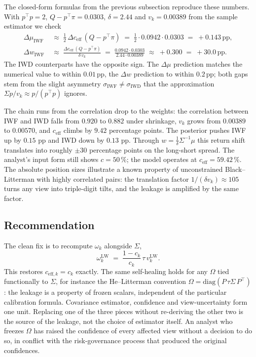 \documentclass[a4paper,11pt]{article}
\theoremstyle{plain}
\theoremstyle{definition}
\newcommand{\LW}{\mathrm{LW}}
\newcommand{\eff}{\mathrm{eff}}
\begin{document}
The closed-form formulas from the previous subsection reproduce these
numbers. With $p^\top p = 2$, $Q - p^\top\pi = 0.0303$, $\delta = 2.44$
and $v_k = 0.00389$ from the sample estimator we check
\begin{align*}
    \Delta\mu_{\mathrm{IWF}} \;&\approx\; \tfrac{1}{2}\,\Delta c_{\eff}\,(Q-p^\top\pi)
    \;=\; \tfrac{1}{2}\cdot 0.0942 \cdot 0.0303
    \;=\; +0.143\,\text{pp},\\
    \Delta w_{\mathrm{IWF}} \;&\approx\; \frac{\Delta c_{\eff}\,(Q-p^\top\pi)}{\delta\,v_k}
    \;=\; \frac{0.0942 \cdot 0.0303}{2.44 \cdot 0.00389}
    \;\approx\; +0.300
    \;=\; +30.0\,\text{pp}.
\end{align*}
The IWD counterparts have the opposite sign. The $\Delta\mu$ prediction
matches the numerical value to within $0.01$\,pp, the $\Delta w$
prediction to within $0.2$\,pp; both gaps stem from the slight
asymmetry $\sigma_{\mathrm{IWF}} \neq \sigma_{\mathrm{IWD}}$ that the
approximation $\Sigma p / v_k \approx p / (p^\top p)$ ignores.

The chain runs from the correlation drop to the weights: the
correlation between IWF and IWD
falls from $0.920$ to $0.882$ under shrinkage, $v_k$ grows from
$0.00389$ to $0.00570$, and $c_{\eff}$ climbs by $9.42$ percentage
points. The posterior pushes IWF up by $0.15$ pp and IWD down by $0.13$
pp. Through $w = \tfrac{1}{\delta}\Sigma^{-1}\mu$ this return shift
translates into roughly $\pm 30$ percentage points on the long-short
spread. The analyst's input form still shows $c = 50\,\%$; the model
operates at $c_{\eff} = 59.42\,\%$. The absolute position sizes
illustrate a known property of unconstrained Black--Litterman with
highly correlated pairs: the translation factor
$1/(\delta v_k) \approx 105$ turns any view into triple-digit tilts,
and the leakage is amplified by the same factor.

\subsection{Recommendation}
\label{sec:rec}

The clean fix is to recompute $\omega_k$ alongside $\Sigma$,
\[
  \omega_k^{\LW} \;=\; \frac{1-c_k}{c_k}\,\tau\,v_k^{\LW}.
\]
This restores $c_{\eff,k} = c_k$ exactly. The same self-healing holds
for any $\Omega$ tied functionally to $\Sigma$, for instance the
He--Litterman convention $\Omega = \mathrm{diag}(P\,\tau\Sigma\,P^\top)$:
the leakage is a property of frozen scalars, independent of the
particular calibration formula. Covariance estimator, confidence and
view-uncertainty form one unit. Replacing one of the three pieces
without re-deriving the other two is the source of the leakage, not the
choice of estimator itself. An analyst who freezes $\Omega$ has raised
the confidence of every affected view without a decision to do so, in
conflict with the risk-governance process that produced the original
confidences.
\end{document}
